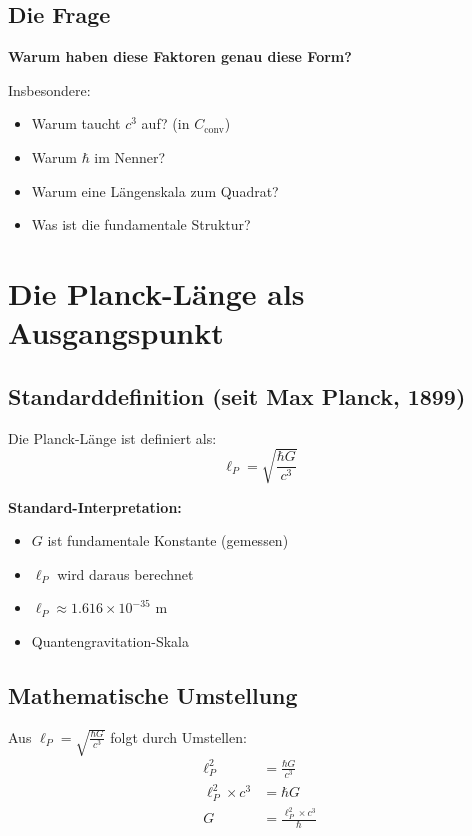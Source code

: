	\subsection{Die Frage}
	
	\textbf{Warum haben diese Faktoren genau diese Form?}
	
	Insbesondere:
	\begin{itemize}
		\item Warum taucht $c^3$ auf? (in $C_{\text{conv}}$)
		\item Warum $\hbar$ im Nenner?
		\item Warum eine Längenskala zum Quadrat?
		\item Was ist die fundamentale Struktur?
	\end{itemize}
	
	\section{Die Planck-Länge als Ausgangspunkt}
	
	\subsection{Standarddefinition (seit Max Planck, 1899)}
	
	Die Planck-Länge ist definiert als:
	\begin{equation}
		\ell_P = \sqrt{\frac{\hbar G}{c^3}}
	\end{equation}
	
	\textbf{Standard-Interpretation:}
	\begin{itemize}
		\item $G$ ist fundamentale Konstante (gemessen)
		\item $\ell_P$ wird daraus berechnet
		\item $\ell_P \approx 1.616 \times 10^{-35}$ m
		\item Quantengravitation-Skala
	\end{itemize}
	
	\subsection{Mathematische Umstellung}
	
	Aus $\ell_P = \sqrt{\frac{\hbar G}{c^3}}$ folgt durch Umstellen:
	\begin{align}
		\ell_P^2 &= \frac{\hbar G}{c^3} \\
		\ell_P^2 \times c^3 &= \hbar G \\
		G &= \frac{\ell_P^2 \times c^3}{\hbar}
	\end{align}
	
